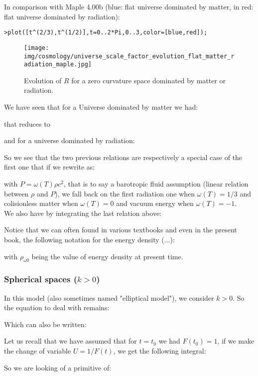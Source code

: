 	In comparison with Maple 4.00b (blue: flat universe dominated by matter, in red: flat universe dominated by radiation):

	\texttt{>plot([t\string^(2/3),t\string^(1/2)],t=0..2*Pi,0..3,color=[blue,red]);}\\
	\begin{figure}[H]
		\centering
		\texttt{[image: img/cosmology/universe\_scale\_factor\_evolution\_flat\_matter\_radiation\_maple.jpg]}	
		\caption[]{Evolution of $R$ for a zero curvature space dominated by matter or radiation.}
	\end{figure} 
	\begin{tcolorbox}[title=Remark,colframe=black,arc=10pt]
	We have seen that for a Universe dominated by matter we had:
	
	that reduces to
	
	and for a universe dominated by radiation:
	
	So we see that the two previous relations are respectively a special case of the first one that if we rewrite as:
	
	with $P=\omega(T)\rho c^2$, that is to say a barotropic fluid assumption (linear relation between $\rho$ and $P$), we fall back on the first radiation one when $\omega(T)=1/3$ and colisionless matter when $\omega(T)=0$ and vacuum energy when $\omega(T)=-1$.\\
	
	We also have by integrating the last relation above:
	
	Notice that we can often found in various textbooks and even in the present book, the following notation for the energy density (...):
	
	with $\rho_{\omega 0}$ being the value of energy density at present time.
	
	\end{tcolorbox}
	
	\subsubsection{Spherical spaces ($k>0$)}
	In this model (also sometimes named "elliptical model"), we consider $k>0$. So the equation to deal with remains:
	
	Which can also be written:
	
	Let us recall that we have assumed that for $t=t_0$ we had $F(t_0)=1$, if we make the change of variable $U=1/F(t)$, we get the following integral:
	
	So we are looking of a primitive of:
	
